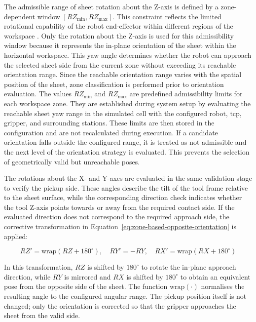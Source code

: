The admissible range of sheet rotation about the Z-axis is defined by a zone-dependent window $[RZ_{\min}, RZ_{\max}]$. This constraint reflects the limited rotational capability of the robot end-effector within different regions of the workspace \cite{Siciliano2016Robotics}. Only the rotation about the Z-axis is used for this admissibility window because it represents the in-plane orientation of the sheet within the horizontal workspace. This yaw angle determines whether the robot can approach the selected sheet side from the current zone without exceeding its reachable orientation range. Since the reachable orientation range varies with the spatial position of the sheet, zone classification is performed prior to orientation evaluation. The values $RZ_{\min}$ and $RZ_{\max}$ are predefined admissibility limits for each workspace zone. They are established during system setup by evaluating the reachable sheet yaw range in the simulated cell with the configured robot, \ac{tcp}, gripper, and surrounding stations. These limits are then stored in the configuration and are not recalculated during execution. If a candidate orientation falls outside the configured range, it is treated as not admissible and the next level of the orientation strategy is evaluated. This prevents the selection of geometrically valid but unreachable poses.

The rotations about the X- and Y-axes are evaluated in the same validation stage to verify the pickup side. These angles describe the tilt of the tool frame relative to the sheet surface, while the corresponding direction check indicates whether the tool Z-axis points towards or away from the required contact side. If the evaluated direction does not correspond to the required approach side, the corrective transformation in Equation~\ref{eq:zone-based-opposite-orientation} is applied:

\begin{equation}
RZ' = \mathrm{wrap}(RZ + 180^\circ), \quad
RY' = -RY, \quad
RX' = \mathrm{wrap}(RX + 180^\circ)
\label{eq:zone-based-opposite-orientation}
\end{equation}

In this transformation, $RZ$ is shifted by $180^\circ$ to rotate the in-plane approach direction, while $RY$ is mirrored and $RX$ is shifted by $180^\circ$ to obtain an equivalent pose from the opposite side of the sheet. The function $\mathrm{wrap}(\cdot)$ normalises the resulting angle to the configured angular range. The pickup position itself is not changed; only the orientation is corrected so that the gripper approaches the sheet from the valid side.

